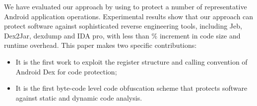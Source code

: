 We have evaluated our approach by using \ToolName to protect a number of
representative Android application operations. Experimental results show that
our approach can protect software against sophisticated reverse engineering
tools, including Jeb, Dex2Jar, dexdump and IDA pro, with less than
\% increment in code size and runtime overhead.
This paper makes two specific contributions:
\begin{itemize}
\item It is the first work to exploit the register structure and calling convention of Android Dex for code protection;
\item It is the first byte-code level code obfuscation scheme that protects software against static and dynamic code analysis.

\end{itemize}

